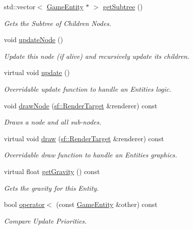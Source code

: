 \begin{DoxyCompactItemize}
\mbox{\label{class_game_entity_ad82de584768994fff9bccca811472a9c}} 
std\+::vector$<$ \mbox{\hyperlink{class_game_entity}{Game\+Entity}} $\ast$ $>$ \mbox{\hyperlink{class_game_entity_ad82de584768994fff9bccca811472a9c}{get\+Subtree}} ()
\begin{DoxyCompactList}\small\item\em Gets the Subtree of Children Nodes. \end{DoxyCompactList}\item 
\mbox{\label{class_game_entity_abb4168ab1f6cb19c35a068f53ac3f33b}} 
void \mbox{\hyperlink{class_game_entity_abb4168ab1f6cb19c35a068f53ac3f33b}{update\+Node}} ()
\begin{DoxyCompactList}\small\item\em Update this node (if alive) and recursively update its children. \end{DoxyCompactList}\item 
virtual void \mbox{\hyperlink{class_game_entity_a49d0e8b07028c0f7884c3daf35521375}{update}} ()
\begin{DoxyCompactList}\small\item\em Overridable update function to handle an Entities logic. \end{DoxyCompactList}\item 
void \mbox{\hyperlink{class_game_entity_ae272a1dab8caaeec31ba7b12cf237c57}{draw\+Node}} (\mbox{\hyperlink{classsf_1_1_render_target}{sf\+::\+Render\+Target}} \&renderer) const
\begin{DoxyCompactList}\small\item\em Draws a node and all sub-\/nodes. \end{DoxyCompactList}\item 
virtual void \mbox{\hyperlink{class_game_entity_ae8417c4fa668594827706c44091f7366}{draw}} (\mbox{\hyperlink{classsf_1_1_render_target}{sf\+::\+Render\+Target}} \&renderer) const
\begin{DoxyCompactList}\small\item\em Overridable draw function to handle an Entities graphics. \end{DoxyCompactList}\item 
\mbox{\label{class_game_entity_a7ff123dbc81d2b0207543ad70a6166f7}} 
virtual float \mbox{\hyperlink{class_game_entity_a7ff123dbc81d2b0207543ad70a6166f7}{get\+Gravity}} () const
\begin{DoxyCompactList}\small\item\em Gets the gravity for this Entity. \end{DoxyCompactList}\item 
bool \mbox{\hyperlink{class_game_entity_af53b7178f6a8ce3878f93a65ef7e6dd6}{operator$<$}} (const \mbox{\hyperlink{class_game_entity}{Game\+Entity}} \&other) const
\begin{DoxyCompactList}\small\item\em Compare Update Priorities. \end{DoxyCompactList}\end{DoxyCompactItemize}
